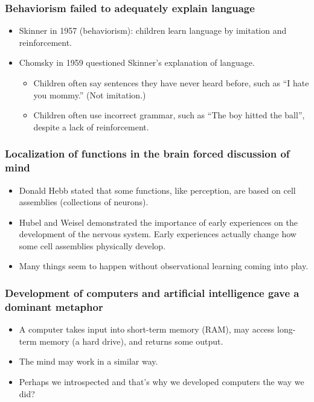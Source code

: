 \documentclass[]{article}
\begin{document}
			\subsubsection{Behaviorism failed to adequately explain language}
				\begin{itemize}
					\item Skinner in 1957 (behaviorism): children learn language by imitation and reinforcement.
					\item Chomsky in 1959 questioned Skinner's explanation of language.
						\begin{itemize}
							\item Children often say sentences they have never heard before, such as ``I hate you mommy.'' (Not imitation.)
							\item Children often use incorrect grammar, such as ``The boy hitted the ball'', despite a lack of reinforcement.
						\end{itemize}
				\end{itemize}

			\subsubsection{Localization of functions in the brain forced discussion of mind}
				\begin{itemize}
					\item Donald Hebb stated that some functions, like perception, are based on cell assemblies (collections of neurons).
					\item Hubel and Weisel demonstrated the importance of early experiences on the development of the nervous system. Early experiences actually change how some cell assemblies physically develop.
					\item Many things seem to happen without observational learning coming into play.
				\end{itemize}

			\subsubsection{Development of computers and artificial intelligence gave a dominant metaphor}
				\begin{itemize}
					\item A computer takes input into short-term memory (RAM), may access long-term memory (a hard drive), and returns some output.
					\item The mind may work in a similar way.
					\item Perhaps we introspected and that's why we developed computers the way we did?
				\end{itemize}
\end{document}
